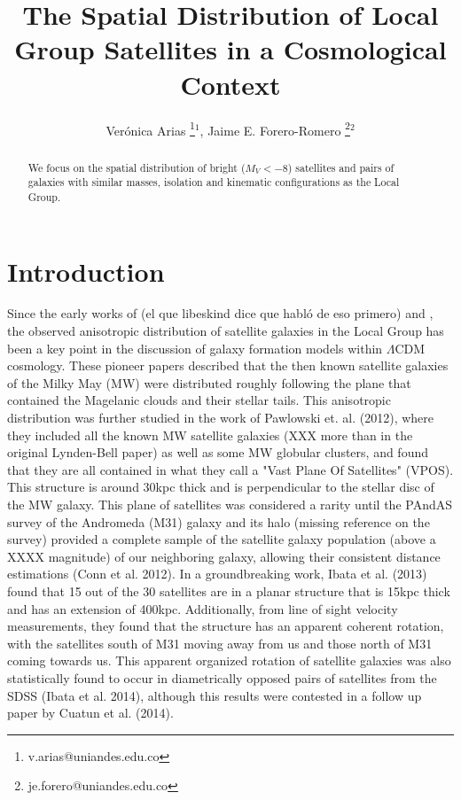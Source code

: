 \documentclass{emulateapj}
\begin{document}
\title{The Spatial Distribution of Local Group Satellites in a
  Cosmological Context}  
\author{
  Ver\'onica Arias \thanks{v.arias@uniandes.edu.co}$^{1}$,
  Jaime E. Forero-Romero \thanks{je.forero@uniandes.edu.co}$^{2}$ 
}


\begin{abstract}
We focus on the spatial distribution of bright ($M_V<-8$) satellites and
pairs of galaxies with similar masses, isolation and kinematic
configurations as the Local Group. 
\end{abstract}


\section{Introduction}

Since the early works of (el que libeskind dice que habló de
eso primero) and \cite{1976MNRAS.174..695L}, the observed anisotropic
distribution of satellite galaxies in the Local Group has been a key
point in the discussion of galaxy formation models within $\Lambda$CDM
cosmology. These pioneer papers described that the then known satellite
galaxies of the Milky May (MW) were distributed roughly following the plane
that contained the Magelanic clouds and their stellar tails. This
anisotropic distribution was further studied in the work of \cite{}Pawlowski
et. al. (2012), where they included all the known MW satellite galaxies (XXX
more than in the original Lynden-Bell paper) as well as some MW globular
clusters, and found that they are all contained in what they call a
"Vast Plane Of Satellites" (VPOS). This structure is around 30kpc thick and
is perpendicular to the stellar disc of the MW galaxy. This plane of
satellites was considered a rarity until the PAndAS survey of the
Andromeda (M31) galaxy and its halo (missing reference on the survey)
provided a complete sample of the satellite galaxy population (above a
XXXX magnitude) of our neighboring galaxy, allowing their consistent distance
estimations (Conn et al. 2012). In a groundbreaking work, Ibata et
al. (2013) found that 15 out of the 30 satellites are in a planar
structure that is 15kpc thick and has an extension of 400kpc.
Additionally, from line of sight velocity measurements, they
found that the structure has an apparent coherent rotation, with the
satellites south of M31 moving away from us and those north of M31
coming towards us. This apparent organized rotation of satellite galaxies was also
statistically found to occur in diametrically opposed 
pairs of satellites from the SDSS (Ibata et al. 2014), although this
results were contested in a follow up paper by Cuatun et al. (2014).  
\end{document}
